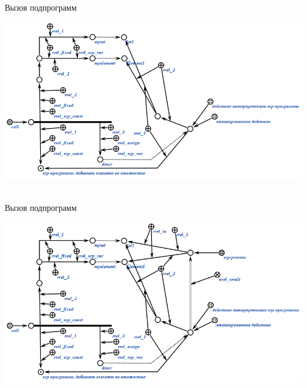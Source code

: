 \begin{frame}{\\Вызов подпрограмм}
	\topline
	\justifying
	\vspace{10mm}
	
	
	\begin{center}
		\includegraphics[scale=0.55]{figures/sd_scp/call2.png}
	\end{center}
	
\end{frame}

\begin{frame}{\\Вызов подпрограмм}
	\topline
	\justifying
	\vspace{10mm}
	
	\begin{center}
		\includegraphics[scale=0.55]{figures/sd_scp/call3.png}
	\end{center}
	
\end{frame}

